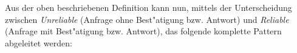 \begin{figure}[!h]
\begin{center}
	\end{center}
\end{figure}




Aus der oben beschriebenen Definition kann nun, mittels der Unterscheidung zwischen {\it Unreliable} (Anfrage ohne Best"atigung bzw. Antwort) und {\it Reliable} (Anfrage mit Best"atigung bzw. Antwort), das folgende komplette Pattern abgeleitet werden:

